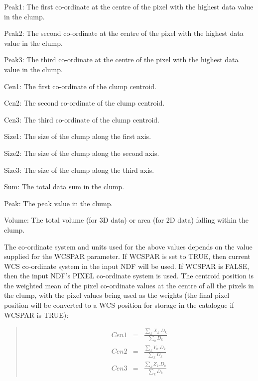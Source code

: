 \documentclass[twoside,11pt]{starlink}
\newenvironment{myquote}{\begin{quote}\begin{small}}{\end{small}\end{quote}}
\begin{document}
\begin{aligndesc}
\item[Peak1:] The first co-ordinate at the centre of the pixel with the
highest data value in the clump.
\item[Peak2:] The second co-ordinate at the centre of the pixel with the
highest data value in the clump.
\item[Peak3:] The third co-ordinate at the centre of the pixel with the
highest data value in the clump.
\item[Cen1:] The first co-ordinate of the clump centroid.
\item[Cen2:] The second co-ordinate of the clump centroid.
\item[Cen3:] The third co-ordinate of the clump centroid.
\item[Size1:] The size of the clump along the first axis.
\item[Size2:] The size of the clump along the second axis.
\item[Size3:] The size of the clump along the third axis.
\item[Sum:] The total data sum in the clump.
\item[Peak:] The peak value in the clump.
\item[Volume:] The total volume (for 3D data) or area (for 2D data)
falling within the clump.
\end{aligndesc}

The co-ordinate system and units used for the above values depends on the
value supplied for the WCSPAR parameter. If WCSPAR is set to TRUE, then
current WCS co-ordinate system in the input NDF will be used. If WCSPAR is
FALSE, then the input NDF's PIXEL co-ordinate system is used. The centroid
position is the weighted mean of the pixel co-ordinate values at the centre
of all the pixels in the clump, with the pixel values being used as the
weights (the final pixel position will be converted to a WCS position for
storage in the catalogue if WCSPAR is TRUE):

\begin{myquote}
\begin{eqnarray*}
  Cen1 & = & \frac{\sum_{k}X_{k}.D_{k}}{\sum_{k}D_{k}} \\
  Cen2 & = & \frac{\sum_{k}Y_{k}.D_{k}}{\sum_{k}D_{k}} \\
  Cen3 & = & \frac{\sum_{k}Z_{k}.D_{k}}{\sum_{k}D_{k}}
\end{eqnarray*}
\end{myquote}
\end{document}
